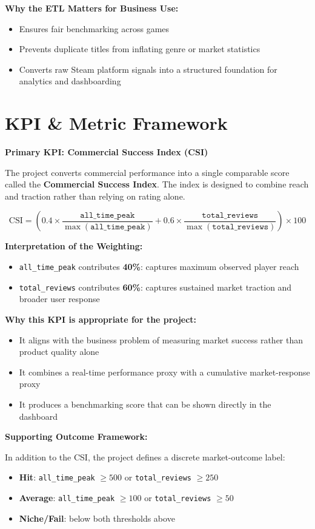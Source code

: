 \documentclass[12pt,a4paper]{report}
\begin{document}
\textbf{Why the ETL Matters for Business Use:}
\begin{itemize}
\item Ensures fair benchmarking across games
\item Prevents duplicate titles from inflating genre or market statistics
\item Converts raw Steam platform signals into a structured foundation for analytics and dashboarding
\end{itemize}

\chapter{KPI \& Metric Framework}

\textbf{Primary KPI: Commercial Success Index (CSI)}

The project converts commercial performance into a single comparable score called the \textbf{Commercial Success Index}. The index is designed to combine reach and traction rather than relying on rating alone.

\[
\text{CSI} = \left(0.4 \times \frac{\texttt{all\_time\_peak}}{\max(\texttt{all\_time\_peak})} + 0.6 \times \frac{\texttt{total\_reviews}}{\max(\texttt{total\_reviews})}\right) \times 100
\]

\textbf{Interpretation of the Weighting:}
\begin{itemize}
\item \texttt{all\_time\_peak} contributes \textbf{40\%}: captures maximum observed player reach
\item \texttt{total\_reviews} contributes \textbf{60\%}: captures sustained market traction and broader user response
\end{itemize}

\textbf{Why this KPI is appropriate for the project:}
\begin{itemize}
\item It aligns with the business problem of measuring market success rather than product quality alone
\item It combines a real-time performance proxy with a cumulative market-response proxy
\item It produces a benchmarking score that can be shown directly in the dashboard
\end{itemize}

\textbf{Supporting Outcome Framework:}

In addition to the CSI, the project defines a discrete market-outcome label:
\begin{itemize}
\item \textbf{Hit}: \texttt{all\_time\_peak} $\geq 500$ or \texttt{total\_reviews} $\geq 250$
\item \textbf{Average}: \texttt{all\_time\_peak} $\geq 100$ or \texttt{total\_reviews} $\geq 50$
\item \textbf{Niche/Fail}: below both thresholds above
\end{itemize}
\end{document}
